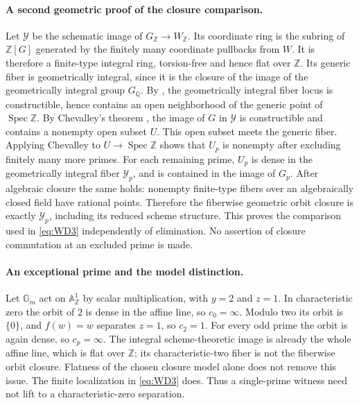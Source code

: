 \paragraph{A second geometric proof of the closure comparison.}
Let $\mathcal Y$ be the schematic image of $G_{\mathbb Z}\to W_{\mathbb Z}$.
Its coordinate ring is the subring of $\mathbb Z[G]$ generated by the
finitely many coordinate pullbacks from $W$. It is therefore a
finite-type integral ring, torsion-free and hence flat over
$\mathbb Z$.  Its generic fiber is geometrically integral, since it
is the closure of the image of the geometrically integral group
$G_{\mathbb Q}$.  By \citet[Theorem~9.7.7(iv), pp.~79--81]{EGAIV3},
the geometrically integral fiber locus is constructible, hence contains
an open neighborhood of the generic point of $\operatorname{Spec}\mathbb Z$.
By Chevalley's theorem \citep[Theorem~1.8.4, p.~239]{EGAIV1}, the image
of $G$ in $\mathcal Y$ is constructible and contains a nonempty open
subset $U$.  This open subset meets the generic fiber.  Applying
Chevalley to $U\to\operatorname{Spec}\mathbb Z$ shows that $U_p$ is
nonempty after excluding finitely many more primes.  For each remaining
prime, $U_p$ is dense in the geometrically integral fiber $\mathcal Y_p$,
and is contained in the image of $G_p$.  After algebraic closure the
same holds: nonempty finite-type fibers over an algebraically closed
field have rational points.  Therefore the fiberwise geometric orbit
closure is exactly $\mathcal Y_p$, including its reduced scheme structure.
This proves the comparison used in \eqref{eq:WD3} independently of elimination.
No assertion of closure commutation at an excluded prime is made.

\paragraph{An exceptional prime and the model distinction.}
Let $\mathbb G_m$ act on $\mathbb A^1_{\mathbb Z}$ by scalar
multiplication, with $y=2$ and $z=1$.  In characteristic zero the orbit
of $2$ is dense in the affine line, so $c_0=\infty$.  Modulo two its
orbit is $\{0\}$, and $f(w)=w$ separates $z=1$, so $c_2=1$.
For every odd prime the orbit is again dense, so $c_p=\infty$.
The integral scheme-theoretic image is already the whole affine line,
which is flat over $\mathbb Z$; its characteristic-two fiber is not the
fiberwise orbit closure.  Flatness of the chosen closure model alone
does not remove this issue.  The finite localization in \eqref{eq:WD3} does.
Thus a single-prime witness need not lift to a characteristic-zero separation.


